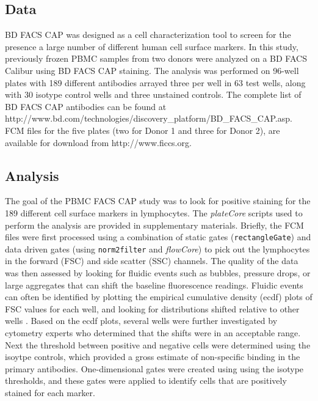 \documentclass[12pt]{article}
\newcommand{\Robject}[1]{{\texttt{#1}}}
\newcommand{\Rpackage}[1]{{\textit{#1}}}
\begin{document}
\subsection*{Data}

BD FACS CAP was designed as a cell characterization tool to screen for the presence a large number of different human 
cell surface markers. In this study, previously frozen PBMC samples  from two donors were analyzed on a BD FACS Calibur
using BD FACS CAP staining. The analysis was performed on 96-well plates with
189 different antibodies arrayed three per well in 63 test wells, along with 30 isotype control wells and three unstained controls.
The complete list of BD FACS CAP antibodies can be found at http://www.bd.com/technologies/discovery\_platform/BD\_FACS\_CAP.asp. 
FCM files for the five plates (two for Donor 1 and three for Donor 2), are available for download from http://www.ficcs.org.

\subsection*{Analysis}





The goal of the PBMC FACS CAP study was to look for positive staining for the 189 different cell
surface markers in lymphocytes. The \Rpackage{plateCore} scripts used to perform the analysis are provided 
in supplementary materials. Briefly, the FCM files were first processed using a combination of static gates (\Robject{rectangleGate})
and data driven gates (using \Robject{norm2filter} and \Rpackage{flowCore}) to pick out the lymphocytes in the forward (FSC) and side scatter (SSC) %
channels.  The quality of the data was then assessed by looking for fluidic events such as bubbles,
pressure drops, or large aggregates that can shift the baseline fluorescence readings. 
Fluidic events can often be identified by plotting the empirical cumulative density (ecdf) plots of FSC
values for each well, and looking for distributions shifted relative to other wells \citep{lemeur2007}. Based on the ecdf
plots, several wells were further investigated by cytometry experts who determined that the shifts were in an acceptable range.
Next the threshold between positive and negative cells were determined using the isoytpe controls, which provided a gross estimate
of non-specific binding in the primary antibodies. One-dimensional gates were created using using the isotype thresholds, and these
gates were applied to identify cells that are positively stained for each marker. 
\end{document}
